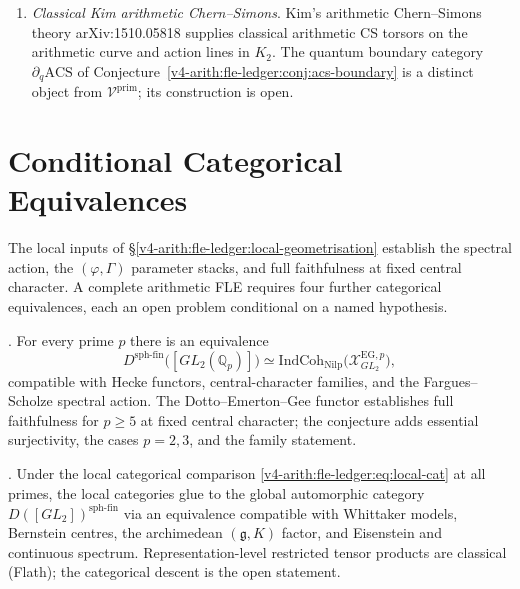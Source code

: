 \begin{theorem}
\begin{enumerate}
\item \emph{Classical Kim arithmetic Chern--Simons}.
  Kim's arithmetic Chern--Simons theory arXiv:1510.05818 supplies
  classical arithmetic CS torsors on the arithmetic curve and action
  lines in \(K_{2}\). The quantum boundary category
  \(\partial_{q}\mathrm{ACS}\) of Conjecture~\ref{v4-arith:fle-ledger:conj:acs-boundary}
  is a distinct object from \(\mathcal{V}^{\mathrm{prim}}\);
  its construction is open.
\end{enumerate}
\end{theorem}

\section{Conditional Categorical Equivalences}
\label{v4-arith:fle-ledger:obligations}

The local inputs of \S\ref{v4-arith:fle-ledger:local-geometrisation}
establish the spectral action, the \((\varphi,\Gamma)\) parameter stacks,
and full faithfulness at fixed central character. A complete arithmetic FLE
requires four further categorical equivalences, each an open problem
conditional on a named hypothesis.

\begin{conjecture}
\label{v4-arith:fle-ledger:conj:local-cat}
\ClaimStatusConjectured. For every prime \(p\) there is an equivalence
\begin{equation}
\label{v4-arith:fle-ledger:eq:local-cat}
D^{\mathrm{sph\text{-}fin}}\bigl([GL_{2}(\mathbb{Q}_{p})]\bigr)
\simeq
\mathrm{IndCoh}_{\mathrm{Nilp}}\bigl(\mathcal{X}^{\mathrm{EG},p}_{GL_{2}}\bigr),
\end{equation}
compatible with Hecke functors, central-character families, and the
Fargues--Scholze spectral action. The Dotto--Emerton--Gee functor
establishes full faithfulness for \(p \geq 5\) at fixed central
character; the conjecture adds essential surjectivity, the cases
\(p = 2, 3\), and the family statement.
\end{conjecture}

\begin{conjecture}
\label{v4-arith:fle-ledger:conj:adelic-descent}
\ClaimStatusConjectured.
Under the local categorical comparison
\eqref{v4-arith:fle-ledger:eq:local-cat} at all primes, the local
categories glue to the global automorphic category
\(D([GL_{2}])^{\mathrm{sph\text{-}fin}}\) via an equivalence
compatible with Whittaker models, Bernstein centres, the archimedean
\((\mathfrak{g},K)\) factor, and Eisenstein and continuous spectrum.
Representation-level restricted tensor products are classical
(Flath); the categorical descent is the open statement.
\end{conjecture}

